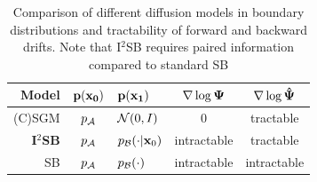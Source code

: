 \begin{table}[H]
  \caption[Comparison of different diffusion models in boundary distributions and tractability]{
    Comparison of different diffusion models in boundary distributions and tractability of forward and backward drifts. Note that I$^2$SB requires paired information compared to standard SB}
  \label{table:comp_diff}
  \label{table:comp}
  \vskip 0.05in
  \begin{center}
    \begin{small}
      \begin{tabular}{rclcc}
        \toprule
        \textbf{Model} & \textbf{$\mathbf{p(\mathbf{x}_0)}$} & \textbf{$\mathbf{p(\mathbf{x}_1)}$} & \textbf{$\mathbf{\nabla\log \Psi}$} & \textbf{$\mathbf{\nabla\log \hat{\Psi}}$} \\ [0.5ex]
        \midrule
        (C)SGM
                       & $p_{\mathcal{A}}$                        & $\mathcal{N}(0,I)$                     & 0                                 & tractable                            \\[0.5ex]
        \textbf{I$^2$SB}
                       & $p_{\mathcal{A}}$                        & $p_{\mathcal{B}}(\cdot|\mathbf{x}_0)$          & intractable                       & tractable                            \\[0.5ex]
        SB
                       & $p_{\mathcal{A}}$                        & $p_{\mathcal{B}}(\cdot)$                 & intractable                       & intractable                          \\
        \bottomrule
      \end{tabular}
    \end{small}
  \end{center}
  \vskip -0.15in
\end{table}


